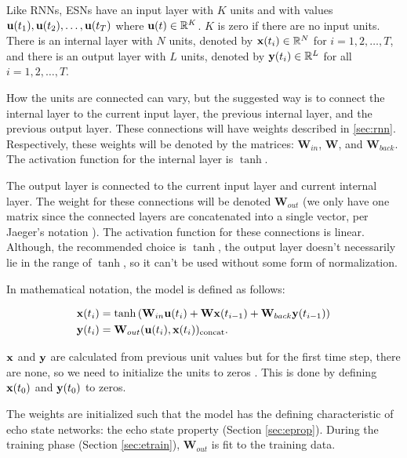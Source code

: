 \documentclass{article}
\begin{document}
Like RNNs, ESNs have an input layer with $K$ units and with values 
$\mathbf{u}(t_1), \mathbf{u}(t_2), \dots,  \mathbf{u}(t_T)$ where $\mathbf{u}(t) \in \mathbb{R}^K$.
$K$ is zero if there are no input units. There is an internal layer
with $N$ units, denoted by $\mathbf{x}(t_i) \in \mathbb{R}^N$ for
$i = 1, 2, \dots, T$, and 
there is an output 
layer with $L$ units, denoted by $\mathbf{y}(t_i) \in \mathbb{R}^L$ for all
$i = 1, 2, \dots, T$.

\newcommand{\W}{\mathbf{W}}
\newcommand{\Win}{\mathbf{W}_{in}}
\newcommand{\Wback}{\mathbf{W}_{back}}
\newcommand{\Wout}{\mathbf{W}_{out}}

How the units are connected can vary, but the suggested way 
\cite{jaeger2002tutorial} is to connect the internal layer to the current 
input layer, the previous internal layer, and the previous output layer. 
These connections will have weights described in \ref{sec:rnn}. 
Respectively, these weights will be denoted by the matrices:
$\Win$, $\W$, and $\Wback$. The activation function for the internal
layer is $\tanh$.

The output layer is connected to the current input layer and current 
internal layer. The weight for these connections will be denoted $\Wout$ 
(we only have one matrix since the connected layers are concatenated into a
single vector, per Jaeger's notation \cite{jaeger2002tutorial}). The 
activation function for these connections is linear. Although, the 
recommended choice
is $\tanh$, the output layer doesn't necessarily lie in the range of 
$\tanh$, so it can't be used without some form of normalization.

In mathematical notation, the model is defined as follows:

\begin{align}
    \xv(t_{i}) &= \tanh \left(
            \Win \uv(t_i)
            + \W \xv(t_{i-1})
            + \Wback \yv(t_{i-1})
        \right) \\
    \yv(t_i) &= \Wout (\uv(t_i), \xv(t_i))_{\text{concat}}.
\end{align}

$\mathbf{x}$ and $\mathbf{y}$ are calculated from previous unit values but for the 
first time step, there are none, so we need to initialize the
units to zeros \cite{jaeger2002tutorial}. 
This is done by defining $\mathbf{x}(t_0)$ and $\mathbf{y}(t_0)$ to zeros.

The weights are initialized such that the model has the defining 
characteristic of echo state networks: the echo state property
(Section \ref{sec:eprop}).
During the training phase (Section \ref{sec:etrain}), $\Wout$ is fit to
the training data. 
\end{document}
